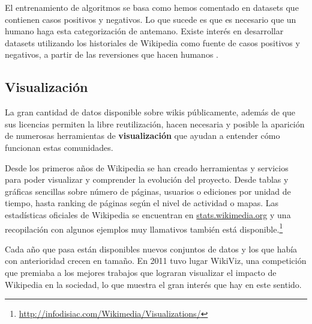\documentclass[11pt,onecolumn]{article}
\begin{document}

El entrenamiento de algoritmos se basa como hemos comentado en datasets que contienen casos positivos y negativos. Lo que sucede es que es necesario que un humano haga esta categorización de antemano. Existe interés en desarrollar datasets utilizando los historiales de Wikipedia como fuente de casos positivos y negativos, a partir de las reversiones que hacen humanos \citep{west2010}.

 \citep{avbot2010}
 \citep{avbot2009}

\subsection{Visualización}


La gran cantidad de datos disponible sobre wikis públicamente, además de que sus licencias permiten la libre reutilización, hacen necesaria y posible la aparición de numerosas herramientas de \textbf{visualización} que ayudan a entender cómo funcionan estas comunidades.

Desde los primeros años de Wikipedia se han creado herramientas y servicios para poder visualizar y comprender la evolución del proyecto. Desde tablas y gráficas sencillas sobre número de páginas, usuarios o ediciones por unidad de tiempo, hasta ranking de páginas según el nivel de actividad o mapas. Las estadísticas oficiales de Wikipedia se encuentran en \href{http://stats.wikimedia.org}{stats.wikimedia.org} y una recopilación con algunos ejemplos muy llamativos también está disponible.\footnote{\href{http://infodisiac.com/Wikimedia/Visualizations/}{http://infodisiac.com/Wikimedia/Visualizations/}}

Cada año que pasa están disponibles nuevos conjuntos de datos y los que había con anterioridad crecen en tamaño. En 2011 tuvo lugar WikiViz, una competición que premiaba a los mejores trabajos que lograran visualizar el impacto de Wikipedia en la sociedad, lo que muestra el gran interés que hay en este sentido.




\end{document}
